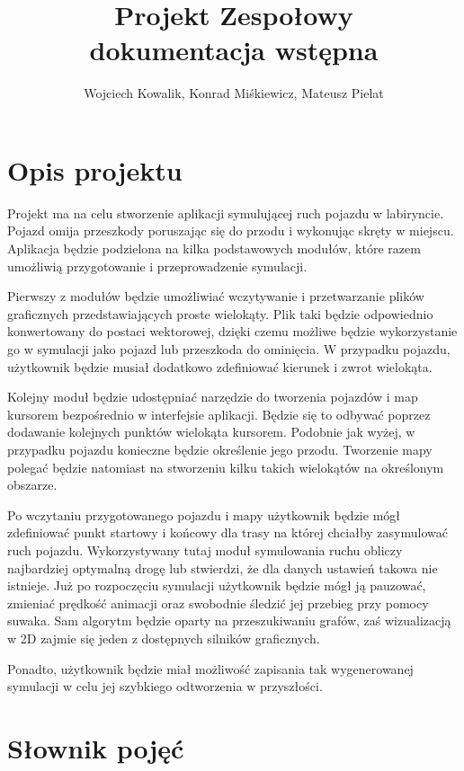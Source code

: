 \documentclass{article}
\let\oldsection\section
\renewcommand\section{\clearpage\oldsection} %
\begin{document}
\title{\textbf{Projekt Zespołowy}\\dokumentacja wstępna}
\author{Wojciech Kowalik, Konrad Miśkiewicz, Mateusz Pielat}
\maketitle


\section{Opis projektu}

Projekt ma na celu stworzenie aplikacji symulującej ruch pojazdu w labiryncie. Pojazd omija przeszkody poruszając się do przodu i wykonując skręty w miejscu. Aplikacja będzie podzielona na kilka podstawowych modułów, które razem umożliwią przygotowanie i przeprowadzenie symulacji.

Pierwszy z modułów będzie umożliwiać wczytywanie i przetwarzanie plików graficznych przedstawiających proste wielokąty. Plik taki będzie odpowiednio konwertowany do postaci wektorowej, dzięki czemu możliwe będzie wykorzystanie go w symulacji jako pojazd lub przeszkoda do ominięcia. W przypadku pojazdu, użytkownik będzie musiał dodatkowo zdefiniować kierunek i zwrot wielokąta.

Kolejny moduł będzie udostępniać narzędzie do tworzenia pojazdów i map kursorem bezpośrednio w interfejsie aplikacji. Będzie się to odbywać poprzez dodawanie kolejnych punktów wielokąta kursorem. Podobnie jak wyżej, w przypadku pojazdu konieczne będzie określenie jego przodu. Tworzenie mapy polegać będzie natomiast na stworzeniu kilku takich wielokątów na określonym obszarze.

Po wczytaniu przygotowanego pojazdu i mapy użytkownik będzie mógł zdefiniować punkt startowy i końcowy dla trasy na której chciałby zasymulować ruch pojazdu. Wykorzystywany tutaj moduł symulowania ruchu obliczy najbardziej optymalną drogę lub stwierdzi, że dla danych ustawień takowa nie istnieje. Już po rozpoczęciu symulacji użytkownik będzie mógł ją pauzować, zmieniać prędkość animacji oraz swobodnie śledzić jej przebieg przy pomocy suwaka. Sam algorytm będzie oparty na przeszukiwaniu grafów, zaś wizualizacją w 2D zajmie się jeden z dostępnych silników graficznych.

Ponadto, użytkownik będzie miał możliwość zapisania tak wygenerowanej symulacji w celu jej szybkiego odtworzenia w przyszłości.



\section{Słownik pojęć}
\end{document}
